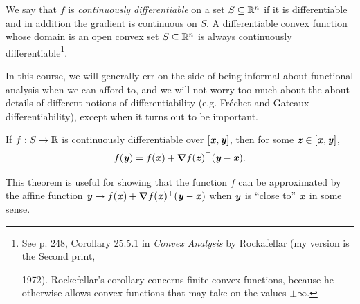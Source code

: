 We say that $f$ is \emph{continuously differentiable} on a set $S \subseteq \mathbb{R}^n $ if it is
differentiable and in addition the gradient is continuous on $S$.
A differentiable convex function whose domain is an
open convex set $S \subseteq \mathbb{R}^n $ is always continuously
differentiable\footnote{See p. 248, Corollary 25.5.1 in \emph{Convex
    Analysis} by Rockafellar (my version is the Second print,

  1972). Rockefellar's corollary concerns finite convex functions, because he
  otherwise allows convex functions that may take on the values $\pm \infty$. }.

\begin{remark*}
  In this course, we will generally err on the side of being informal
  about functional analysis when we can afford to, and we will not
  worry too much about the
  about details of different notions of differentiability
  (e.g. Fr\'{e}chet and Gateaux differentiability), except when
  it turns out to be important.
\end{remark*}

\begin{theorem}
  If $f:S \rightarrow \mathbb{R}$
  is continuously differentiable over $[\boldsymbol{\mathit{x}}, \boldsymbol{\mathit{y}}]$, then for
  some $\boldsymbol{\mathit{z}} \in [\boldsymbol{\mathit{x}}, \boldsymbol{\mathit{y}}]$,
\begin{displaymath}
    f(\boldsymbol{\mathit{y}}) = f(\boldsymbol{\mathit{x}}) + \boldsymbol{\nabla} f(\boldsymbol{\mathit{z}})^\top (\boldsymbol{\mathit{y}}-\boldsymbol{\mathit{x}}).
\end{displaymath}
\end{theorem}

This theorem is useful for showing that the function $f$ can be
approximated by the affine function  ${\boldsymbol{\mathit{y}} \to f(\boldsymbol{\mathit{x}}) + \boldsymbol{\nabla} f(\boldsymbol{\mathit{x}})^\top (\boldsymbol{\mathit{y}}-\boldsymbol{\mathit{x}})}$
when $\boldsymbol{\mathit{y}}$ is ``close to'' $\boldsymbol{\mathit{x}}$ in some sense.


